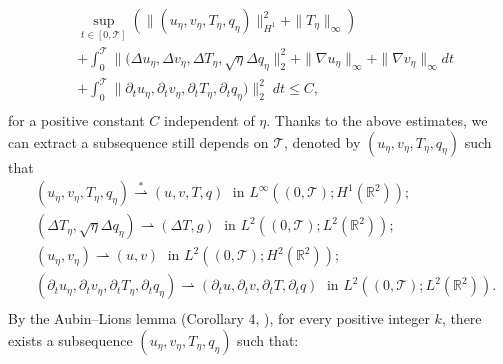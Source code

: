\documentclass[11pt, a4paper, article,reqno,]{amsart}
\theoremstyle{remark}
\numberwithin{equation}{section}
\begin{document}
\begin{equation*}
\begin{aligned}
    & \sup_{t \in [0,\mathcal{T}]} ( \|(u_\eta,v_\eta,T_{\eta},q_\eta)\|^2_{H^1} + \|T_{\eta}\|_\infty)  \\
    & + \int_0^\mathcal{T}\|(\Delta u_\eta, \Delta v_\eta, \Delta T_{\eta}, \sqrt{\eta}\Delta q_\eta\|_2^2 + \|\nabla u_\eta \|_{\infty} + \|\nabla v_\eta \|_{\infty}dt \\
    & + \int_0^\mathcal{T} \| \partial_t u_\eta, \partial_t v_\eta, \partial_t T_{\eta}, \partial_t q_\eta)\|_2^2 \; dt \leq C, \\
\end{aligned}
\end{equation*}
for a positive constant $C$ independent of $\eta$.
Thanks to the above estimates, we can extract a subsequence still depends on $\mathcal{T}$, denoted by $(u_\eta, v_\eta, T_{\eta},q_\eta)$ such that
\begin{equation}\label{conv_1}
    \begin{aligned}
        & (u_\eta, v_\eta, T_{\eta},q_\eta) \overset{\ast}{\rightharpoonup} (u,v,T,q) \; \text{ in } L^{\infty}((0,\mathcal{T});H^1(\mathbb{R}^2)); \\
        & (\Delta T_{\eta}, \sqrt{\eta}\Delta q_\eta) \overset{}{\rightharpoonup} (\Delta T,g) \; \text{ in } L^{2}((0,\mathcal{T});L^2(\mathbb{R}^2));\\
        & (u_\eta, v_\eta) \overset{}{\rightharpoonup} (u,v) \; \text{ in } L^{2}((0,\mathcal{T});H^2(\mathbb{R}^2));\\
        &(\partial_t u_\eta, \partial_tv_\eta, \partial_tT_{\eta},\partial_tq_\eta) \overset{}{\rightharpoonup} (\partial_t u, \partial_tv, \partial_tT,\partial_tq) \; \text{ in } L^{2}((0,\mathcal{T});L^2(\mathbb{R}^2)).\\
    \end{aligned}
\end{equation}
By the Aubin–Lions lemma (Corollary 4, \cite{simons}), for every positive integer $k$, there exists a subsequence $(u_\eta, v_\eta, T_\eta, q_\eta)$ such that:
\end{document}
